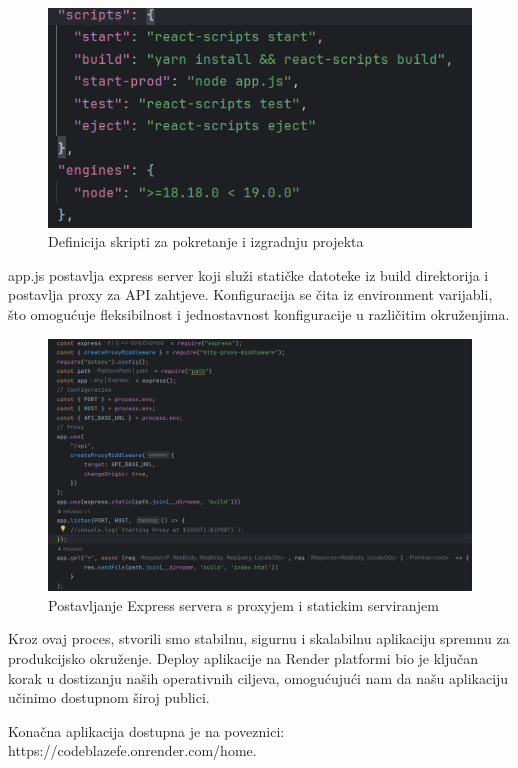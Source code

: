 		\begin{figure} [H]
			\centering
			\includegraphics[width=0.7\linewidth]{slike/package.png}
			\caption{Definicija skripti za pokretanje i izgradnju projekta}
			\label{fig:Definicija skripti za pokretanje i izgradnju projekta}
		\end{figure}

		app.js postavlja express server koji služi statičke datoteke iz build direktorija i postavlja proxy za API zahtjeve. Konfiguracija se čita iz environment varijabli, što omogućuje fleksibilnost i jednostavnost konfiguracije u različitim okruženjima.

		\begin{figure} [H]
			\centering
			\includegraphics[width=0.7\linewidth]{slike/app.png}
			\caption{Postavljanje Express servera s proxyjem i statickim serviranjem}
			\label{fig:Postavljanje Express servera s proxyjem i statickim serviranjem}
		\end{figure}

		Kroz ovaj proces, stvorili smo stabilnu, sigurnu i skalabilnu aplikaciju spremnu za produkcijsko okruženje. Deploy aplikacije na Render platformi bio je ključan korak u dostizanju naših operativnih ciljeva, omogućujući nam da našu aplikaciju učinimo dostupnom široj publici.

		Konačna aplikacija dostupna je na poveznici: https://codeblazefe.onrender.com/home.


		\eject
